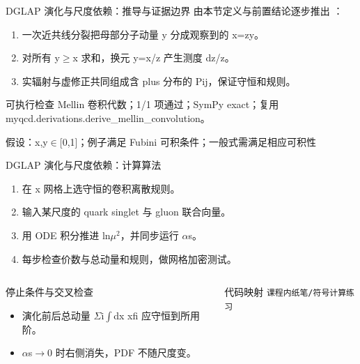 \begin{frame}[t]{DGLAP 演化与尺度依赖：推导与证据边界}
\footnotesize
{}\quad 由本节定义与前置结论逐步推出 ：
\begin{enumerate}
\item 一次近共线分裂把母部分子动量 y 分成观察到的 x=zy。
\item 对所有 y\ensuremath{\ge}x 求和，换元 y=x/\allowbreak{}z 产生测度 dz/\allowbreak{}z。
\item 实辐射与虚修正共同组成含 plus 分布的 Pij，保证守恒和规则。
\end{enumerate}\begin{block}{可执行检查}
\quad Mellin 卷积代数；1/1 项通过；SymPy exact；复用 myqcd.derivations.derive\_mellin\_convolution。
\par\scriptsize 假设：x,y\ensuremath{\in}[0,1]；例子满足 Fubini 可积条件；一般式需满足相应可积性
\end{block}
\end{frame}

\begin{frame}[t]{DGLAP 演化与尺度依赖：计算算法}
\footnotesize
{}\begin{enumerate}
\item 在 x 网格上选守恒的卷积离散规则。
\item 输入某尺度的 quark singlet 与 gluon 联合向量。
\item 用 ODE 积分推进 ln\ensuremath{\mu}\ensuremath{^{2}}，并同步运行 \ensuremath{\alpha}s。
\item 每步检查价数与总动量和规则，做网格加密测试。
\end{enumerate}\begin{columns}[T,onlytextwidth]
\begin{block}{停止条件与交叉检查}\scriptsize\begin{itemize}
\item[\CheckMark] 演化前后总动量 \ensuremath{\Sigma}i\ensuremath{\int}dx xfi 应守恒到所用阶。
\item[\CheckMark] \ensuremath{\alpha}s\ensuremath{\rightarrow}0 时右侧消失，PDF 不随尺度变。
\end{itemize}\end{block}
\begin{block}{代码映射}
\scriptsize \texttt{课程内纸笔/\allowbreak{}符号计算练习}
\end{block}\end{columns}\end{frame}

